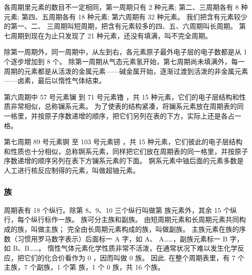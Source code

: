 各周期里元素的数目不一定相同，第一周期只有 2 种元素; 第二、三周期各有 8 种元素; 第四、五周期各有 18 种元素; 第六周期有 32 种元素。
我们把含有元素较少的第一、二、 三周期叫短周期，把含有元素较多的四、五、六周期叫长周期。
第七周期到现在为止只发现了 21 种元素，还没有填满，叫不完全周期。

除第一周期外，同一周期中，从左到右，各元素原子最外电子层的电子数都是从 1 个逐步增加到 8 个。
除第一周期从气态元素氢开始，第七周期尚未填满外，每一周期的元素都是从活泼的金属元素——碱金属开始，逐渐过渡到活泼的非金属元素——卤素，最后以惰性气体结束。

第六周期中 57 号元素镧  到 71 号元素镥 ，共 15 种元素，它们的电子层结构和性质非常相似，总称镧系元素。
为了使表的结构紧凑，将镧系元素放在周期表的同一格里，并按原子序数递增的顺序，把它们另列在表的下方，实际上还是各占一格。

第七周期 89 号元素锕  至 103 号元素铹 ，共 15 种元素，它们彼此的电子层结构和性质也十分相似，总称锕系元素，同样把它们放在周期表的同一格里，并按原子序数递增的顺序另列在表下方镧系元素的下面。
锕系元素中铀后面的元素多数是人工进行核反应制得的元素，叫做超铀元素。

\subsubsection{族}
周期表有 18 个纵行。除第 8、9、10 三个纵行叫做第  族元素外，其余 15 个纵行，每个纵行标作一族。
族可分主族和副族。
由短周期元素和长周期元素共同构成的族，叫做主族；
完全由长周期元素构成的族，叫做副族。
主族元素在族的序数（习惯用罗马数字表示）后面标一 A 字，如 A、 A……，副族元素标一 B 字，如 B、B……。
惰性气体元素化学性质非常不活泼，在通常状况下难以发生化学反应，把它们的化合价看作为 0 ，因而叫做 0 族。
因此. 在整个周期表里，有 7 个主族，7 个副族，1 个第  族，1 个 0 族，共 16 个族。

